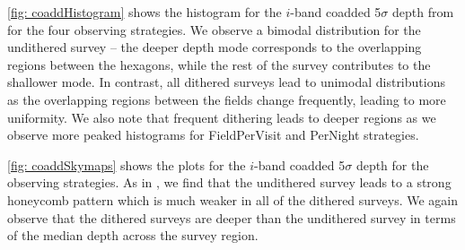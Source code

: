 \autoref{fig: coaddHistogram} shows the histogram for the $i$-band coadded 5$\sigma$ depth from  for the four observing strategies. We observe a bimodal distribution for the undithered survey -- the deeper depth mode corresponds to the overlapping regions between the hexagons, while the rest of the survey contributes to the shallower mode. In contrast, all dithered surveys lead to unimodal distributions as the overlapping regions between the fields change frequently, leading to more uniformity. We also note that frequent dithering leads to deeper regions as we observe more peaked histograms for FieldPerVisit and PerNight strategies.

\autoref{fig: coaddSkymaps} shows the plots for the $i$-band coadded 5$\sigma$ depth for the observing strategies. As in \citet{AwanEtal2016}, we find that the undithered survey leads to a strong honeycomb pattern which is much weaker in all of the dithered surveys. We again observe that the dithered surveys are deeper than the undithered survey in terms of the median depth across the survey region.

